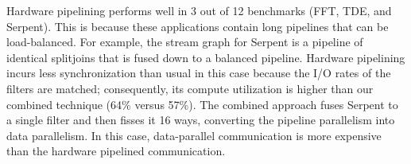 Hardware pipelining performs well in 3 out of 12 benchmarks (FFT, TDE,
and Serpent). This is because these applications contain long
pipelines that can be load-balanced.  For example, the stream graph
for Serpent is a pipeline of identical splitjoins that is fused down
to a balanced pipeline. Hardware pipelining incurs less
synchronization than usual in this case because the I/O rates of the
filters are matched; consequently, its compute utilization is higher
than our combined technique (64\% versus 57\%).  The combined approach
fuses Serpent to a single filter and then fisses it 16 ways,
converting the pipeline parallelism into data parallelism.  In this
case, data-parallel communication is more expensive than the hardware
pipelined communication.







